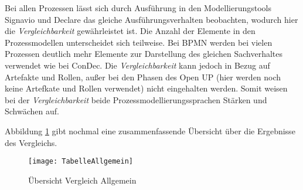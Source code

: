 Bei allen Prozessen lässt sich durch Ausführung in den Modellierungstools Signavio und Declare das gleiche Ausführungsverhalten beobachten, wodurch hier die \textit{Vergleichbarkeit} gewährleistet ist. \newline
Die Anzahl der Elemente in den Prozessmodellen unterscheidet sich teilweise. Bei BPMN werden bei vielen Prozessen deutlich mehr Elemente zur Darstellung des gleichen Sachverhaltes verwendet wie bei ConDec.\newline
Die \textit{Vergleichbarkeit} kann jedoch in Bezug auf Artefakte und Rollen, außer bei den Phasen des Open UP (hier werden noch keine Artefkate und Rollen verwendet) nicht eingehalten werden.\newline
Somit weisen bei der \textit{Vergleichbarkeit} beide Prozessmodellierungssprachen Stärken und Schwächen auf. \newline

Abbildung \ref{fig:TabelleAllgemein} gibt nochmal eine zusammenfassende Übersicht über die Ergebnisse des Vergleichs. 



 \begin{figure}[!htbp]
\begin{center}
  \texttt{[image: TabelleAllgemein]} %
  \caption{Übersicht Vergleich Allgemein}
  \label{fig:TabelleAllgemein}
\end{center}
\end{figure}





